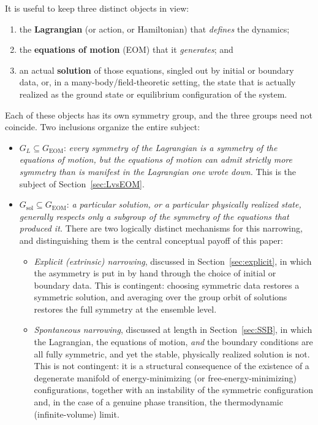 \documentclass[11pt]{article}
\theoremstyle{definition}
\theoremstyle{remark}
\newcommand{\GEOM}{G_{\mathrm{EOM}}}
\newcommand{\GL}{G_{L}}
\begin{document}
It is useful to keep three distinct objects in view:
\begin{enumerate}[label=(\roman*)]
\item the \textbf{Lagrangian} (or action, or Hamiltonian) that \emph{defines} the dynamics;
\item the \textbf{equations of motion} (EOM) that it \emph{generates}; and
\item an actual \textbf{solution} of those equations, singled out by initial or boundary data, or, in a many-body/field-theoretic setting, the state that is actually realized as the ground state or equilibrium configuration of the system.
\end{enumerate}
Each of these objects has its own symmetry group, and the three groups need not coincide. Two inclusions organize the entire subject:
\begin{itemize}
\item $\GL \subseteq \GEOM$: \emph{every symmetry of the Lagrangian is a symmetry of the equations of motion, but the equations of motion can admit strictly more symmetry than is manifest in the Lagrangian one wrote down.} This is the subject of Section~\ref{sec:LvsEOM}.
\item $G_{\text{sol}} \subseteq \GEOM$: \emph{a particular solution, or a particular physically realized state, generally respects only a subgroup of the symmetry of the equations that produced it.} There are two logically distinct mechanisms for this narrowing, and distinguishing them is the central conceptual payoff of this paper:
\begin{itemize}
\item \emph{Explicit (extrinsic) narrowing}, discussed in Section~\ref{sec:explicit}, in which the asymmetry is put in by hand through the choice of initial or boundary data. This is contingent: choosing symmetric data restores a symmetric solution, and averaging over the group orbit of solutions restores the full symmetry at the ensemble level.
\item \emph{Spontaneous narrowing}, discussed at length in Section~\ref{sec:SSB}, in which the Lagrangian, the equations of motion, \emph{and} the boundary conditions are all fully symmetric, and yet the stable, physically realized solution is not. This is not contingent: it is a structural consequence of the existence of a degenerate manifold of energy-minimizing (or free-energy-minimizing) configurations, together with an instability of the symmetric configuration and, in the case of a genuine phase transition, the thermodynamic (infinite-volume) limit.
\end{itemize}
\end{itemize}
\end{document}
